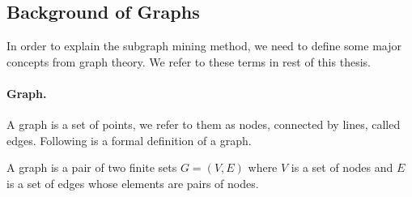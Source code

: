 
\subsection{Background of Graphs}
\label{sec:back-graphs}
In order to explain the subgraph mining method, we need to define some major concepts from graph theory. 
We refer to these terms in rest of this thesis.

\paragraph{Graph.}

A graph is a set of points, we refer to them as nodes, connected by lines, called edges. 
Following is a formal definition of a graph. 

\begin{definition}
A graph is a pair of two finite sets $G=( V, E )$ where $V$ is a set of nodes and $E$ is a set of edges whose elements are pairs of nodes. 
\end{definition} 


